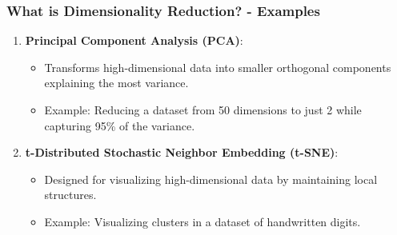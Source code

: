 \documentclass[aspectratio=169]{beamer}
\begin{document}
\begin{frame}[fragile]
    \frametitle{What is Dimensionality Reduction? - Examples}
    \begin{enumerate}
        \item \textbf{Principal Component Analysis (PCA)}:
            \begin{itemize}
                \item Transforms high-dimensional data into smaller orthogonal components explaining the most variance.
                \item Example: Reducing a dataset from 50 dimensions to just 2 while capturing 95\% of the variance.
            \end{itemize}
        \item \textbf{t-Distributed Stochastic Neighbor Embedding (t-SNE)}:
            \begin{itemize}
                \item Designed for visualizing high-dimensional data by maintaining local structures.
                \item Example: Visualizing clusters in a dataset of handwritten digits.
            \end{itemize}
    \end{enumerate}
\end{frame}
\end{document}
